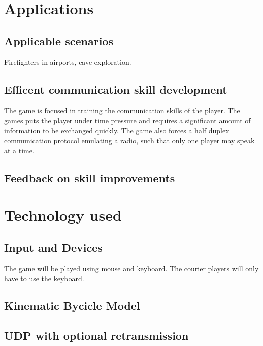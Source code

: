 \documentclass{article}
\begin{document}
\clearpage

\section{Applications}
\subsection{Applicable scenarios}
Firefighters in airports, cave exploration.
\subsection{Efficent communication skill development}
The game is focused in training the communication skills of the player. The games puts the player under time pressure and requires a significant amount of information to be exchanged quickly. The game also forces a half duplex communication protocol emulating a radio, such that only one player may speak at a time.
\subsection{Feedback on skill improvements}

\clearpage

\section{Technology used}
\subsection{Input and Devices}
The game will be played using mouse and keyboard. The courier players will only have to use the keyboard.
\subsection{Kinematic Bycicle Model}
\subsection{UDP with optional retransmission}
\end{document}
